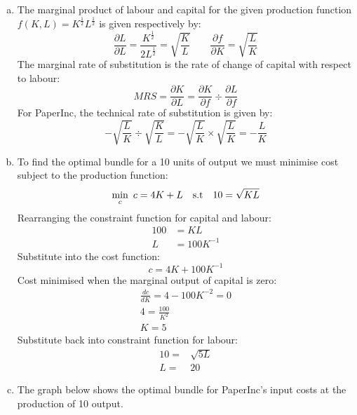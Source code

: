 \documentclass[11pt,a4paper,twocolumn]{article}
\begin{document}
\begin{enumerate}[(a)]

    \item 
    
        The marginal product of labour and capital for the given production function $f(K,L) = K^{\frac{1}{2}}L^{\frac{1}{2}}$ is given respectively by: 
        $$
            \frac{\partial L}{\partial L}=  \frac{K^{\frac{1}{2}}}{2L^{\frac{1}{2}}} = \sqrt{\frac{K}{L}} \qquad \frac{\partial f}{\partial K}=\sqrt{\frac{L}{K}} 
        $$
        The marginal rate of substitution is the rate of change of capital with respect to labour: 
        $$
            MRS = \frac{\partial K}{\partial L} = \frac{\partial K}{\partial f} \div \frac{\partial L}{\partial f} 
        $$
        For PaperInc, the technical rate of substitution is given by:
        $$
            - \sqrt{\frac{L}{K}} \div \sqrt{\frac{K}{L}} = - \sqrt{\frac{L}{K}} \times \sqrt{\frac{L}{K}} = - \frac{L}{K}
        $$
    
    
    \item 
    
        To find the optimal bundle for a 10 units of output we must minimise cost subject to the production function: 
        $$
            \min_{c} \ c = 4K + L \quad \textnormal{s.t} \quad 10 = \sqrt{KL}
        $$
        Rearranging the constraint function for capital and labour: 
        \begin{align*}
            100 &= KL  \\
            L &= 100K^{-1}
        \end{align*}
        Substitute into the cost function: 
        $$
            c= 4K + 100K^{-1}
        $$
        Cost minimised when the marginal output of capital is zero: 
        \begin{gather*}
            \frac{dc}{dK}=4-100K^{-2}=0\\
            4=\frac{100}{K^2}\\
            K=5
        \end{gather*}
        Substitute back into constraint function for labour: 
        \begin{align*}
            10=&\sqrt{5L}\\
            L=&20
        \end{align*}
    
    \item 
    
    The graph below shows the optimal bundle for PaperInc's input costs at the production of 10 output.
    

\end{enumerate}
\end{document}
